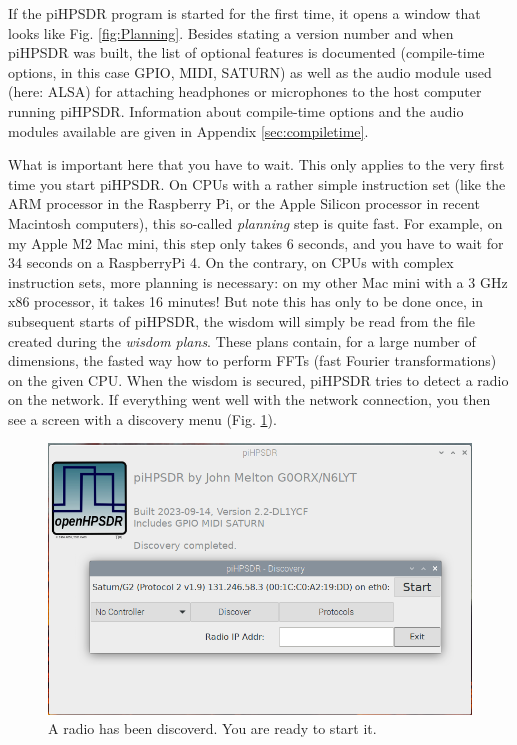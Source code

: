 \documentclass[12pt]{book}
\begin{document}
If the piHPSDR program is started for the first time, it opens a window that looks like Fig. \ref{fig:Planning}.
Besides stating a version number and when piHPSDR was built, the list of optional features is
documented (compile-time options,
in this case  GPIO, MIDI, SATURN) as well as the audio module used (here: ALSA) for attaching headphones
or microphones to the host computer running piHPSDR. Information about compile-time options and the 
audio modules available are given in Appendix \ref{sec:compiletime}.

What is important here that you have to wait. This only applies to the very first time you start piHPSDR.
On CPUs with a rather simple instruction set (like the ARM processor in the Raspberry Pi, or the Apple
Silicon processor in recent Macintosh computers), this so-called  \textit{planning} step is quite fast. For
example, on my
Apple M2 Mac mini, this step only takes 6 seconds, and you have to wait for 34 seconds on a RaspberryPi 4.
On the contrary, on CPUs with
complex instruction sets, more planning is necessary: on my other Mac mini with a 3 GHz x86 processor, it
takes 16 minutes! But note
this has only to be done once, in subsequent starts of piHPSDR, the wisdom will simply be read from
the file created during the \textit{wisdom plans}. These plans contain, for a large number of dimensions,
the fasted way how to perform FFTs (fast Fourier transformations) on the given CPU.
When the wisdom is secured, piHPSDR tries to detect a radio on the network. If everything went well with
the network connection, you then see a screen with a discovery menu (Fig. \ref{fig:Start}).

\begin{figure}
\center
\includegraphics[width=12cm]{Start.png}
\caption{A radio has been discoverd. You are ready  to start it.}
\label{fig:Start}
\end{figure}
\end{document}

